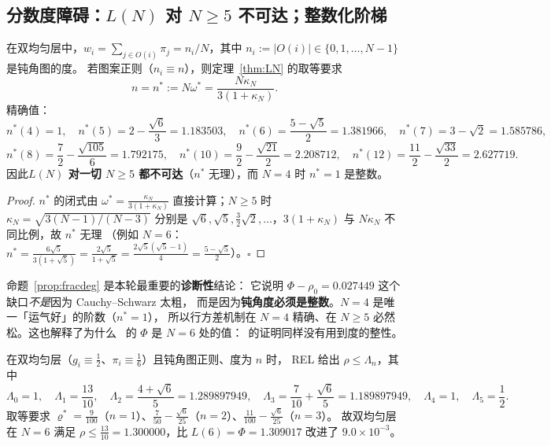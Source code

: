 
\subsection{分数度障碍：$L(N)$ 对 $N\ge5$ 不可达；整数化阶梯}\label{sec:ladder}

\begin{proposition}[分数度障碍，已证]\label{prop:fracdeg}
在双均匀层中，$w_i=\sum_{j\in O(i)}\pi_j=n_i/N$，其中 $n_i:=|O(i)|\in\{0,1,\dots,N-1\}$ 是钝角图的度。
若图案正则（$n_i\equiv n$），则定理~\ref{thm:LN} 的取等要求
\[
n=n^*:=N\omega^*=\frac{N\kappa_N}{3(1+\kappa_N)} .
\]
精确值：
\[
n^*(4)=1,\quad n^*(5)=2-\frac{\sqrt6}3=1.183503,\quad n^*(6)=\frac{5-\sqrt5}2=1.381966,\quad
n^*(7)=3-\sqrt2=1.585786,
\]
\[
n^*(8)=\frac72-\frac{\sqrt{105}}6=1.792175,\quad n^*(10)=\frac92-\frac{\sqrt{21}}2=2.208712,\quad
n^*(12)=\frac{11}2-\frac{\sqrt{33}}2=2.627719 .
\]
因此\textbf{$L(N)$ 对一切 $N\ge5$ 都不可达}（$n^*$ 无理），而 $N=4$ 时 $n^*=1$ 是整数。
\end{proposition}

\begin{proof}
$n^*$ 的闭式由 $\omega^*=\frac{\kappa_N}{3(1+\kappa_N)}$ 直接计算；$N\ge5$ 时 $\kappa_N=\sqrt{3(N-1)/(N-3)}$
分别是 $\sqrt6,\sqrt5,\frac32\sqrt2,\dots$，$3(1+\kappa_N)$ 与 $N\kappa_N$ 不同比例，故 $n^*$ 无理
（例如 $N=6$：$n^*=\frac{6\sqrt5}{3(1+\sqrt5)}=\frac{2\sqrt5}{1+\sqrt5}=\frac{2\sqrt5(\sqrt5-1)}4=\frac{5-\sqrt5}2$）。$\square$
\end{proof}

\begin{remark}\label{rmk:fracdegread}
命题~\ref{prop:fracdeg} 是本轮最重要的\textbf{诊断性}结论：
它说明 $\Phi-\rho_0=0.027449$ 这个缺口\emph{不是}因为 Cauchy--Schwarz 太粗，
而是因为\textbf{钝角度必须是整数}。$N=4$ 是唯一「运气好」的阶数（$n^*=1$），
所以行方差机制在 $N=4$ 精确、在 $N\ge5$ 必然松。这也解释了为什么
\STW\ 的 $\Phi$ 是 $N=6$ 处的值：\STW\ 的证明同样没有用到度的整性。
\end{remark}

\begin{proposition}[$N=6$ 的整数化阶梯，已证（精确闭式）]\label{prop:ladder6}
在双均匀层（$g_i\equiv\frac12$、$\pi_i\equiv\frac16$）且钝角图正则、度为 $n$ 时，
REL 给出 $\rho\le\Lambda_n$，其中
\[
\Lambda_0=1,\quad \Lambda_1=\frac{13}{10},\quad \Lambda_2=\frac{4+\sqrt6}5=1.289897949,\quad
\Lambda_3=\frac7{10}+\frac{\sqrt6}5=1.189897949,\quad \Lambda_4=1,\quad \Lambda_5=\frac12 .
\]
取等要求 $\varrho^*=\frac{9}{100}$（$n=1$）、$\frac7{50}-\frac{\sqrt6}{25}$（$n=2$）、$\frac{11}{100}-\frac{\sqrt6}{25}$（$n=3$）。
故双均匀层在 $N=6$ 满足 $\rho\le\frac{13}{10}=1.300000$，比 $L(6)=\Phi=1.309017$ 改进了 $9.0\times10^{-3}$。
\end{proposition}

